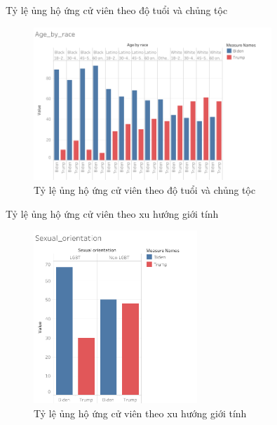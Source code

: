 \documentclass[10pt]{beamer}
\theoremstyle{remark}
\theoremstyle{definition}
\begin{document}
\begin{frame}{Tỷ lệ ủng hộ ứng cử viên theo độ tuổi và chủng tộc}
	\begin{figure}[h!]
        \centering
        \includegraphics[width=0.8\textwidth]{figures/Age_by_race.png}
        \caption{Tỷ lệ ủng hộ ứng cử viên theo độ tuổi và chủng tộc}
    \end{figure}
\end{frame}

\begin{frame}{Tỷ lệ ủng hộ ứng cử viên theo xu hướng giới tính}
	\begin{figure}[h!]
        \centering
        \includegraphics[width=0.55\textwidth]{figures/Sexual_orientation.png}
        \caption{Tỷ lệ ủng hộ ứng cử viên theo xu hướng giới tính}
    \end{figure}
\end{frame}
\end{document}
